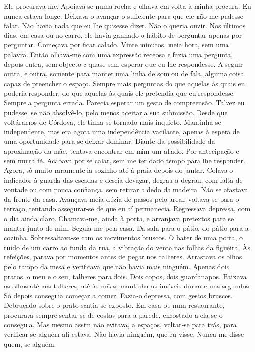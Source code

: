 Ele procurava­‑me. Apoiava­‑se numa rocha e olhava em volta à minha
procura. Eu nunca estava longe. Deixava­‑o avançar o suficiente para que
ele não me pudesse falar. Não havia nada que eu lhe quisesse dizer. Não
o queria ouvir. Nos últimos dias, em casa ou no carro, ele havia ganhado
o hábito de perguntar apenas por perguntar. Começava por ficar calado.
Vinte minutos, meia hora, sem uma palavra. Então olhava­‑me com uma
expressão receosa e fazia uma pergunta, depois outra, sem objecto e
quase sem esperar que eu lhe respondesse. A seguir outra, e outra,
somente para manter uma linha de som ou de fala, alguma coisa capaz de
preencher o espaço. Sempre mais perguntas do que aquelas às quais eu
poderia responder, do que aquelas às quais ele pretendia que eu
respondesse. Sempre a pergunta errada. Parecia esperar um gesto de
compreensão. Talvez eu pudesse, se não absolvê­‑lo, pelo menos aceitar a
sua submissão. Desde que voltáramos de Córdova, ele tinha­‑se tornado
mais inquieto. Mantinha­‑se independente, mas era agora uma
independência vacilante, apenas à espera de uma oportunidade para se
deixar dominar. Diante da possibilidade da aproximação da mãe, tentava
encontrar em mim um aliado. Por antecipação e sem muita fé. Acabava por
se calar, sem me ter dado tempo para lhe responder. Agora, só muito
raramente ia sozinho até à praia depois do jantar. Colava o indicador à
guarda das escadas e descia devagar, degrau a degrau, com falta de
vontade ou com pouca confiança, sem retirar o dedo da madeira. Não se
afastava da frente da casa. Avançava meia dúzia de passos pelo areal,
voltava­‑se para o terraço, tentando assegurar­‑se de que eu aí
permanecia. Regressava depressa, com o dia ainda claro. Chamava­‑me,
ainda à porta, e arranjava pretextos para se manter junto de mim.
Seguia­‑me pela casa. Da sala para o pátio, do pátio para a cozinha.
Sobressaltava­‑se com os movimentos bruscos. O bater de uma porta, o
ruído de um carro ao fundo da rua, a vibração do vento nas folhas da
figueira. Às refeições, parava por momentos antes de pegar nos talheres.
Arrastava os olhos pelo tampo da mesa e verificava que não havia mais
ninguém. Apenas dois pratos, o meu e o seu, talheres para dois. Dois
copos, dois guardanapos. Baixava os olhos até aos talheres, até às mãos,
mantinha­‑as imóveis durante uns segundos. Só depois conseguia começar a
comer. Fazia­‑o depressa, com gestos bruscos. Debruçado sobre o prato
sentia­‑se exposto. Em casa ou num restaurante, procurava sempre
sentar­‑se de costas para a parede, encostado a ela se o conseguia. Mas
mesmo assim não evitava, a espaços, voltar­‑se para trás, para verificar
se alguém ali estava. Não havia ninguém, que eu visse. Nunca me disse
quem, se alguém.

